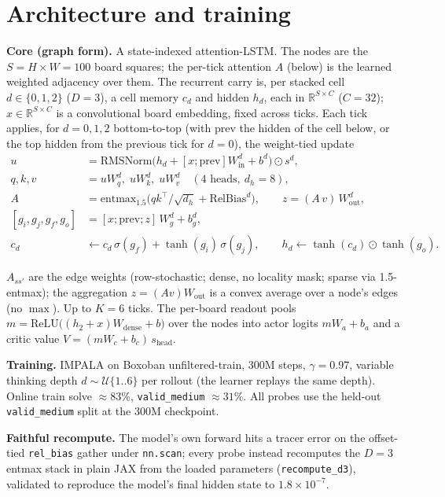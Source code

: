\documentclass[11pt]{article}
\begin{document}
\section{Architecture and training}
\vspace{-2pt}
\textbf{Core (graph form).} A state-indexed attention-LSTM. The nodes are the $S{=}H{\times}W{=}100$ board
squares; the per-tick attention $A$ (below) is the learned weighted adjacency over them. The recurrent carry
is, per stacked cell $d\in\{0,1,2\}$ ($D{=}3$), a cell memory $c_d$ and hidden $h_d$, each in
$\mathbb{R}^{S\times C}$ ($C{=}32$); $x\in\mathbb{R}^{S\times C}$ is a convolutional board embedding, fixed
across ticks. Each tick applies, for $d=0,1,2$ bottom-to-top (with $\mathrm{prev}$ the hidden of the cell
below, or the top hidden from the previous tick for $d{=}0$), the weight-tied update
\vspace{-3pt}
\begin{align*}
u &= \mathrm{RMSNorm}\!\big(h_d + [x;\mathrm{prev}]W_{\mathrm{in}}^d + b^d\big)\odot s^d,\\
q,k,v &= u W_q^d,\; u W_k^d,\; u W_v^d \quad(\text{4 heads},\ d_h{=}8),\\
A &= \mathrm{entmax}_{1.5}\!\big(qk^{\top}/\sqrt{d_h} + \mathrm{RelBias}^d\big),\qquad z=(A\,v)\,W_{\mathrm{out}}^d,\\
[g_i,g_j,g_f,g_o] &= [x;\mathrm{prev};z]\,W_g^d + b_g^d,\\
c_d &\leftarrow c_d\,\sigma(g_f) + \tanh(g_i)\,\sigma(g_j),\qquad h_d \leftarrow \tanh(c_d)\odot\tanh(g_o).
\end{align*}
\vspace{-6pt}

$A_{ss'}$ are the edge weights (row-stochastic; dense, no locality mask; sparse via 1.5-entmax); the
aggregation $z=(A v)W_{\mathrm{out}}$ is a convex average over a node's edges (no $\max$). Up to $K{=}6$
ticks. The per-board readout pools $m=\mathrm{ReLU}\big((h_2+x)W_{\mathrm{dense}}+b\big)$ over the nodes into
actor logits $mW_a+b_a$ and a critic value $V=(mW_c+b_c)\,s_{\mathrm{head}}$.

\textbf{Training.} IMPALA on Boxoban unfiltered-train, $300$M steps, $\gamma{=}0.97$, variable thinking
depth $d\sim\mathcal{U}\{1..6\}$ per rollout (the learner replays the same depth). Online train solve
$\approx83\%$, \texttt{valid\_medium} $\approx31\%$. All probes use the held-out \texttt{valid\_medium}
split at the $300$M checkpoint.

\textbf{Faithful recompute.} The model's own forward hits a tracer error on the offset-tied
\texttt{rel\_bias} gather under \texttt{nn.scan}; every probe instead recomputes the $D{=}3$ entmax stack in
plain JAX from the loaded parameters (\texttt{recompute\_d3}), validated to reproduce the model's final
hidden state to $1.8\times10^{-7}$.
\end{document}
